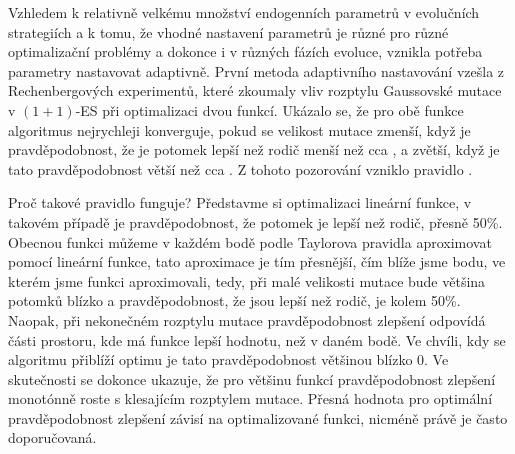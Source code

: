 Vzhledem k relativně velkému množství endogenních parametrů v evolučních strategiích a k tomu, že vhodné nastavení parametrů je různé pro různé optimalizační problémy a dokonce i v různých fázích evoluce, vznikla potřeba parametry nastavovat adaptivně. První metoda adaptivního nastavování vzešla z Rechenbergových experimentů,\cite{rechenberg1973} které zkoumaly vliv rozptylu Gaussovské mutace v $(1+1)$-ES při optimalizaci dvou funkcí. Ukázalo se, že pro obě funkce algoritmus nejrychleji konverguje, pokud se velikost mutace zmenší, když je pravděpodobnost, že je potomek lepší než rodič menší než cca \fifth, a zvětší, když je tato pravděpodobnost větší než cca \fifth. Z tohoto pozorování vzniklo pravidlo \fifth.

Proč takové pravidlo funguje? Představme si optimalizaci lineární funkce, v takovém případě je pravděpodobnost, že potomek je lepší než rodič, přesně 50\%. 
Obecnou funkci můžeme v každém bodě podle Taylorova pravidla aproximovat pomocí lineární funkce, tato aproximace je tím přesnější, čím blíže jsme bodu, ve kterém jsme funkci aproximovali, tedy, při malé velikosti mutace bude většina potomků blízko a pravděpodobnost, že jsou lepší než rodič, je kolem 50\%. Naopak, při nekonečném rozptylu mutace pravděpodobnost zlepšení odpovídá části prostoru, kde má funkce lepší hodnotu, než v daném bodě. Ve chvíli, kdy se algoritmu přiblíží optimu je tato pravděpodobnost většinou blízko 0. Ve skutečnosti se dokonce ukazuje, že pro většinu funkcí pravděpodobnost zlepšení monotónně roste s klesajícím rozptylem mutace. Přesná hodnota pro optimální pravděpodobnost zlepšení závisí na optimalizované funkci, nicméně právě \fifth je často doporučovaná.


